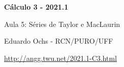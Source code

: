 \documentclass[oneside,12pt]{article}
\begin{document}


\long{}
\long{}
\long{}
\long{}
\long{}
\long{}
\long{}
\long{}
\long{}
\long{}
\long{}

\long{}
\long{}

\def\frown{\ensuremath{{=}{(}}}
\def\True {\mathbf{V}}
\def\False{\mathbf{F}}
\def\D    {\displaystyle}
\def\derivs{\mathsf{derivs}}

\def\drafturl{http://angg.twu.net/LATEX/2021-1-C3.pdf}
\def\drafturl{http://angg.twu.net/2021.1-C3.html}
\def\draftfooter{\tiny \href{\drafturl}{\jobname{}} \ColorBrown{\shorttoday{} \hours}}



%

\thispagestyle{empty}

\begin{center}

\vspace*{1.2cm}

{\bf \Large Cálculo 3 - 2021.1}

\bsk

Aula 5: Séries de Taylor e MacLaurin

\bsk

Eduardo Ochs - RCN/PURO/UFF

\url{http://angg.twu.net/2021.1-C3.html}

\end{center}
\end{document}
